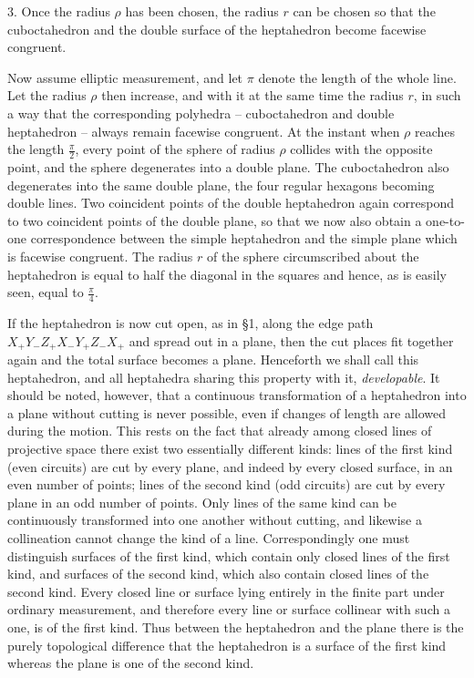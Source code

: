 \documentclass[11pt,a4paper]{article}
\begin{document}
3. Once the radius $\rho$ has been chosen, the radius $r$ can be chosen so that the cuboctahedron and the double surface of the heptahedron become facewise congruent.

Now assume elliptic measurement, and let $\pi$ denote the length of the whole line. Let the radius $\rho$ then increase, and with it at the same time the radius $r$, in such a way that the corresponding polyhedra -- cuboctahedron and double heptahedron -- always remain facewise congruent. At the instant when $\rho$ reaches the length $\frac{\pi}{2}$, every point of the sphere of radius $\rho$ collides with the opposite point, and the sphere degenerates into a double plane. The cuboctahedron also degenerates into the same double plane, the four regular hexagons becoming double lines. Two coincident points of the double heptahedron again correspond to two coincident points of the double plane, so that we now also obtain a one-to-one correspondence between the simple heptahedron and the simple plane which is facewise congruent. The radius $r$ of the sphere circumscribed about the heptahedron is equal to half the diagonal in the squares and hence, as is easily seen, equal to $\frac{\pi}{4}$.

If the heptahedron is now cut open, as in \S 1, along the edge path $X_+Y_-Z_+X_-Y_+Z_-X_+$ and spread out in a plane, then the cut places fit together again and the total surface becomes a plane. Henceforth we shall call this heptahedron, and all heptahedra sharing this property with it, \emph{developable}. It should be noted, however, that a continuous transformation of a heptahedron into a plane without cutting is never possible, even if changes of length are allowed during the motion. This rests on the fact that already among closed lines of projective space there exist two essentially different kinds: lines of the first kind (even circuits) are cut by every plane, and indeed by every closed surface, in an even number of points; lines of the second kind (odd circuits) are cut by every plane in an odd number of points. Only lines of the same kind can be continuously transformed into one another without cutting, and likewise a collineation cannot change the kind of a line. Correspondingly one must distinguish surfaces of the first kind, which contain only closed lines of the first kind, and surfaces of the second kind, which also contain closed lines of the second kind. Every closed line or surface lying entirely in the finite part under ordinary measurement, and therefore every line or surface collinear with such a one, is of the first kind. Thus between the heptahedron and the plane there is the purely topological difference that the heptahedron is a surface of the first kind whereas the plane is one of the second kind.
\end{document}
